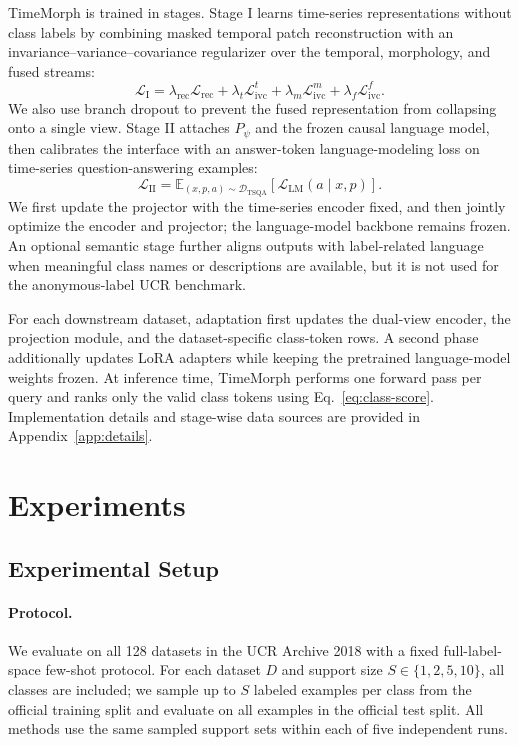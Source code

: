 \documentclass{article}
\begin{document}
TimeMorph is trained in stages. Stage I learns time-series representations
without class labels by combining masked temporal patch reconstruction with an
invariance--variance--covariance regularizer \citep{bardes2022vicreg} over the
temporal, morphology, and fused streams:
\begin{equation}
\label{eq:stage1-loss}
\mathcal{L}_{\mathrm{I}}
=
\lambda_{\mathrm{rec}}\mathcal{L}_{\mathrm{rec}}
+
\lambda_t\mathcal{L}_{\mathrm{ivc}}^{t}
+
\lambda_m\mathcal{L}_{\mathrm{ivc}}^{m}
+
\lambda_f\mathcal{L}_{\mathrm{ivc}}^{f}.
\end{equation}
We also use branch dropout to prevent the fused representation from collapsing
onto a single view. Stage II attaches $P_\psi$ and the frozen causal language
model, then calibrates the interface with an answer-token language-modeling loss
on time-series question-answering examples:
\begin{equation}
\label{eq:stage2-loss}
\mathcal{L}_{\mathrm{II}}
=
\mathbb{E}_{(x,p,a)\sim\mathcal{D}_{\mathrm{TSQA}}}
\left[
\mathcal{L}_{\mathrm{LM}}(a\mid x,p)
\right].
\end{equation}
We first update the projector with the time-series encoder fixed, and then jointly
optimize the encoder and projector; the language-model backbone remains frozen.
An optional semantic stage further aligns outputs with label-related language
when meaningful class names or descriptions are available, but it is not used for
the anonymous-label UCR benchmark.

For each downstream dataset, adaptation first updates the dual-view encoder, the
projection module, and the dataset-specific class-token rows. A second phase
additionally updates LoRA adapters while keeping the pretrained language-model
weights frozen. At inference time, TimeMorph performs one forward pass per query
and ranks only the valid class tokens using Eq.~\eqref{eq:class-score}.
Implementation details and stage-wise data sources are provided in
Appendix~\ref{app:details}.

\section{Experiments}
\label{sec:experiments}

\subsection{Experimental Setup}

\paragraph{Protocol.}
We evaluate on all 128 datasets in the UCR Archive 2018 with a fixed full-label-space few-shot protocol. For each dataset $D$ and support size $S\in\{1,2,5,10\}$, all classes are included; we sample up to $S$ labeled examples per class from the official training split and evaluate on all examples in the official test split. All methods use the same sampled support sets within each of five independent runs.
\end{document}

